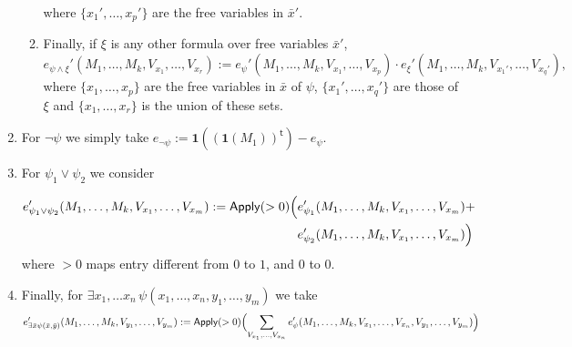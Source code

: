 \begin{enumerate}
\begin{enumerate}
\[\]
where $\{x_1',\ldots,x_p'\}$ are the free variables in $\bar x'$.
\item Finally, if $\xi$ is any other formula over free variables $\bar x'$,
\[
e_{\psi\land \xi}'(M_1,\ldots,M_k,V_{x_1},\ldots,V_{x_r}):=e_{\psi}'(M_1,\ldots,M_k,V_{x_1},\ldots,V_{x_p})\cdot e_{\xi}'(M_1,\ldots,M_k,V_{x_1'},\ldots,V_{x_q'}),\]
where $\{x_1,\ldots,x_p\}$ are the free variables in $\bar x$ of $\psi$, $\{x_1',\ldots,x_q'\}$ are those of $\xi$ and $\{x_1,\ldots,x_r\}$ is the union of these sets.
\end{enumerate}
\item For $\neg \psi$ we simply take $e_{\neg\psi}:=\mathbf{1}((\mathbf{1}(M_1))^{\mathsf{t}}) - e_{\psi}$.

\item For $\psi_1\vee \psi_2$ we consider

\begin{align*}
e_{\psi_1\vee\psi_2}'(M_1,\ldots,M_k,V_{x_1},\ldots,V_{x_m}):=\mathsf{Apply}(>0)\Bigl(&e_{\psi_1}'(M_1,\ldots,M_k,V_{x_1},\ldots,V_{x_m})+ \\
&e_{\psi_2}'(M_1,\ldots,M_k,V_{x_1},\ldots,V_{x_m}) \Bigr)
\end{align*}
where $>0$ maps entry different from $0$ to $1$, and $0$ to $0$.

\item Finally, for $\exists x_1,\ldots x_n\, \psi(x_1,\ldots,x_n,y_1,\ldots,y_m)$ we take
\[
e_{\exists\bar x\psi(\bar x,\bar y)}'(M_1,\ldots,M_k,V_{y_1},\ldots,V_{y_m}):=\mathsf{Apply}(>0)\Bigl(\sum_{V_{x_1},\ldots,V_{x_n}} e_{\psi}'(M_1,\ldots,M_k,V_{x_1},\ldots,V_{x_n},V_{y_1},\ldots,V_{y_m})  \Bigr)
\]
\end{enumerate}